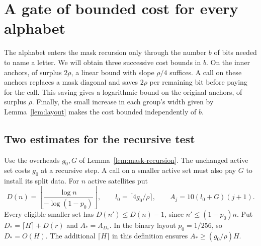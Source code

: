 \section{A gate of bounded cost for every alphabet}\label{sec:recurrence}

The alphabet enters the mask recursion only through the number \(b\)
of bits needed to name a letter. We will obtain three successive cost
bounds in \(b\). On the inner anchors, of surplus \(2\rho\), a linear
bound with slope \(\rho/4\) suffices. A call on these anchors replaces a
mask diagonal and saves \(2\rho\) per remaining bit before paying for the
call. This saving gives a logarithmic bound on the original anchors, of
surplus \(\rho\). Finally, the small increase in each group's width
given by Lemma~\ref{lem:layout} makes the cost bounded independently of
\(b\).

\subsection{Two estimates for the recursive test}

Use the overheads \(g_0,G\) of Lemma~\ref{lem:mask-recursion}. The
unchanged active set costs \(g_0\) at a recursive step. A call on a
smaller active set must also pay \(G\) to install its split data. For
\(n\) active satellites put
\[
 D(n)=\left\lfloor\frac{\log n}{-\log(1-p_0)}\right\rfloor,\qquad
 l_0=\lceil4g_0/\rho\rceil,\qquad
 A_j=10(l_0+G)(j+1).
\]
Every eligible smaller set has \(D(n')\le D(n)-1\), since
\(n'\le(1-p_0)n\). Put \(D_*=\lceil H\rceil+D(r)\) and \(A_*=A_{D_*}\).
In the binary layout \(p_0=1/256\), so \(D_*=O(H)\). The additional
\(\lceil H\rceil\) in this definition ensures
\(A_*\ge (g_0/\rho)H\).


